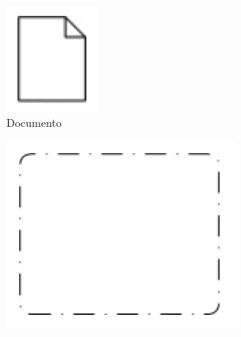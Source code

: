 \begin{figure}[H]
    \centering
    \begin{subfigure}[b]{0.2\textwidth}
        \centering
        \includegraphics[width=\textwidth]{img/bpmn-data.png}
        \caption{Documento}
    \end{subfigure}
    \hfill
    \begin{subfigure}[b]{0.3\textwidth}
        \centering
        \includegraphics[width=\textwidth]{img/bpmn-group.png}

\end{subfigure}
\end{figure}
